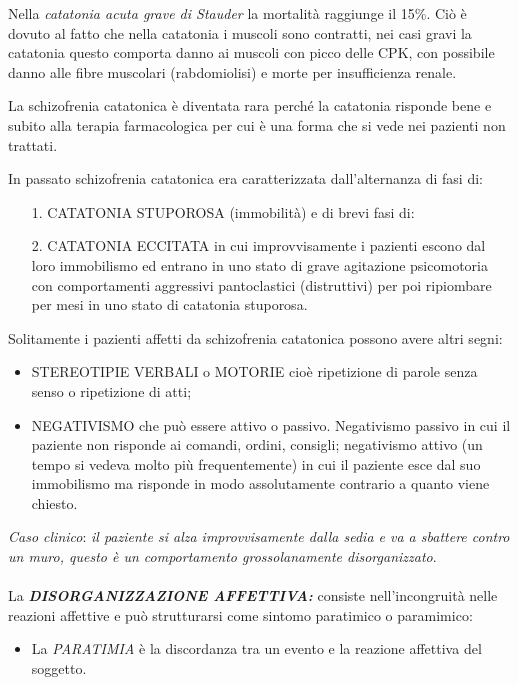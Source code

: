 \begin{itemize}
Nella \emph{\emph{catatonia acuta grave di Stauder}} la mortalità
raggiunge il 15\%. Ciò è dovuto al fatto che nella catatonia i muscoli
sono contratti, nei casi gravi la catatonia questo comporta danno ai
muscoli con picco delle CPK, con possibile danno alle fibre muscolari
(rabdomiolisi) e morte per insufficienza renale.

La schizofrenia catatonica è diventata rara perché la catatonia risponde
bene e subito alla terapia farmacologica per cui è una forma che si vede
nei pazienti non trattati.

In passato schizofrenia catatonica era caratterizzata dall'alternanza di
fasi di:

\begin{itemize}
\item[1.]
  CATATONIA STUPOROSA (immobilità) e di brevi fasi di:
\item[2.]
  CATATONIA ECCITATA in cui improvvisamente i pazienti escono dal loro
  immobilismo ed entrano in uno stato di grave agitazione psicomotoria
  con comportamenti aggressivi pantoclastici (distruttivi) per poi
  ripiombare per mesi in uno stato di catatonia stuporosa.
\end{itemize}

Solitamente i pazienti affetti da schizofrenia catatonica possono avere
altri segni:

\begin{itemize}
\item
  STEREOTIPIE VERBALI o MOTORIE cioè ripetizione di parole senza senso o
  ripetizione di atti;
\item
  NEGATIVISMO che può essere attivo o passivo. Negativismo passivo in
  cui il paziente non risponde ai comandi, ordini, consigli; negativismo
  attivo (un tempo si vedeva molto più frequentemente) in cui il
  paziente esce dal suo immobilismo ma risponde in modo assolutamente
  contrario a quanto viene chiesto.
\end{itemize}

\emph{Caso clinico}: \emph{il paziente si alza improvvisamente dalla
sedia e va a sbattere contro un muro, questo è un comportamento
grossolanamente disorganizzato}.
\\\\
La \textbf{\emph{DISORGANIZZAZIONE AFFETTIVA:}} consiste
nell'incongruità nelle reazioni affettive e può strutturarsi come
sintomo paratimico o paramimico:

\begin{itemize}
\item
  La \emph{PARATIMIA} è la discordanza tra un evento e la reazione
  affettiva del soggetto.


\end{itemize}
\end{itemize}
